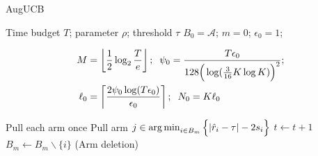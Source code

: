 \begin{algorithm}[t!]
\caption{AugUCB}
\label{alg:augucb}
\begin{algorithmic}
 Time budget $T$; parameter $\rho$; 
  threshold $\tau$
 $B_{0}=\mathcal{A}$; $m=0$; $\epsilon_{0}=1$;
\begin{small}
\begin{align*}
M&=\left\lfloor \frac{1}{2}\log_{2} \frac{T}{e}\right\rfloor; 
\hspace{2mm}\psi_{0}=\frac{T\epsilon_{0}}{128\Big(\log(\frac{3}{16}K\log K)\Big)^2}; \\
\ell_{0}&=\left\lceil \frac{2\psi_0\log( T\epsilon_{0})}{\epsilon_{0}} \right\rceil;
\hspace{2mm}N_{0}=K\ell_{0}
\end{align*}
\end{small}
\State Pull each arm once
\vspace{-2mm}
\State {}
\State Pull arm $j\in\operatorname*{arg\,min}_{i\in B_{m}}\Big\lbrace |\hat{r}_{i} - \tau | - 2s_{i}\Big\rbrace$
\State $t\leftarrow t+1$ 
\vspace{-4mm}
\State {}
\vspace{-4mm}
\State {}
\State $B_m\leftarrow B_m\backslash\{i\}$\hspace{4mm} (Arm deletion)
\EndIf
\EndFor

\end{algorithmic}
\end{algorithm}
